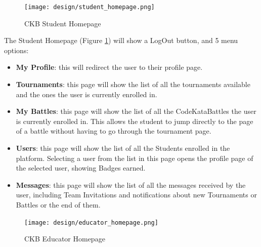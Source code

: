\begin{figure} [H]
    \begin{center}
        \texttt{[image: design/student\_homepage.png]}
        \caption{CKB Student Homepage}
        \label{fig: student_homepage}
    \end{center}
\end{figure}
The Student Homepage (Figure \ref{fig: student_homepage}) will show a LogOut button, and 5 menu options:
\begin{itemize}
    \item \textbf{My Profile}: this will redirect the user to their profile page.
    \item \textbf{Tournaments}: this page will show the list of all the tournaments available and the ones the user is currently enrolled in.
    \item \textbf{My Battles}: this page will show the list of all the CodeKataBattles the user is currently enrolled in. This allows the student to 
    jump directly to the page of a battle without having to go through the tournament page.
    \item \textbf{Users}: this page will show the list of all the Students enrolled in the platform. 
    Selecting a user from the list in this page opens the profile page of the selected user, showing Badges earned.
    \item \textbf{Messages}: this page will show the list of all the messages received by the user, including Team Invitations and notifications about new Tournaments or Battles or the end of them.
\end{itemize}

\begin{figure} [H]
    \begin{center}
        \texttt{[image: design/educator\_homepage.png]}
        \caption{CKB Educator Homepage}
        \label{fig: educator_homepage}
    \end{center}
\end{figure}

